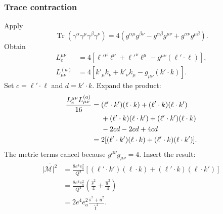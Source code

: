\documentclass[14pt,a4paper]{extarticle}
\numberwithin{equation}{section}
\newcommand{\M}{\mathcal M}
\begin{document}
\subsubsection{Trace contraction}
Apply
\begin{equation}
 \operatorname{Tr}(\gamma^\alpha\gamma^\mu\gamma^\beta\gamma^\nu)
 =4(g^{\alpha\mu}g^{\beta\nu}-g^{\alpha\beta}g^{\mu\nu}
 +g^{\alpha\nu}g^{\mu\beta}).
\end{equation}
Obtain
\begin{align}
 L_e^{\mu\nu}
 &=4[\ell'^\mu\ell^\nu+\ell'^\nu\ell^\mu
 -g^{\mu\nu}(\ell'\cdot\ell)],
 \label{eq:hard-electron-trace}\\
 L^{(a)}_{\mu\nu}
 &=4[k'_\mu k_\nu+k'_\nu k_\mu-g_{\mu\nu}(k'\cdot k)].
 \label{eq:hard-quark-trace}
\end{align}
Set $c=\ell'\cdot\ell$ and $d=k'\cdot k$. Expand the product:
\begin{align}
 \frac{L_e^{\mu\nu}L^{(a)}_{\mu\nu}}{16}
 ={}& (\ell'\cdot k')(\ell\cdot k)
 +(\ell'\cdot k)(\ell\cdot k')\notag\\
 &+(\ell'\cdot k)(\ell\cdot k')
 +(\ell'\cdot k')(\ell\cdot k)\notag\\
 &-2cd-2cd+4cd\\
 ={}&2[(\ell'\cdot k')(\ell\cdot k)
 +(\ell'\cdot k)(\ell\cdot k')].
 \label{eq:hard-tensor-contraction}
\end{align}
The metric terms cancel because $g^{\mu\nu}g_{\mu\nu}=4$.
Insert the result:
\begin{align}
 \overline{|\M|^2}
 &=\frac{8e^4e_a^2}{Q^4}
 [(\ell'\cdot k')(\ell\cdot k)
 +(\ell'\cdot k)(\ell\cdot k')]
 \label{eq:hard-dot-result}\\
 &=\frac{8e^4e_a^2}{Q^4}
 \left(\frac{\hat s^2}{4}+\frac{\hat u^2}{4}\right)\\
 &=\boxed{2e^4e_a^2\frac{\hat s^2+\hat u^2}{\hat t^2}}.
 \label{eq:hard-mandelstam-result}
\end{align}
\end{document}
